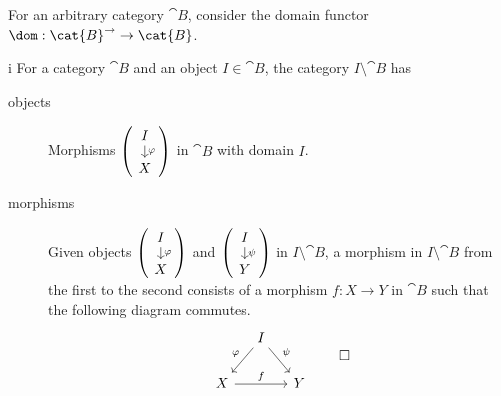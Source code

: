 \begin{exercise}
For an arbitrary category \(\cat{B}\), consider the domain functor \(\dom : \cat{B}^{\rightarrow} \to \cat{B}\).
\end{exercise}

\begin{partsolution}{i}
For a category \(\cat{B}\) and an object \(I \in \cat{B}\), the category \(I \setminus \cat{B}\) has
\begin{description}
\item[objects]
Morphisms \(\begin{pmatrix}\begin{tikzcd}[row sep=small] I \arrow[d, "\varphi"] \\ X\end{tikzcd}\end{pmatrix}\) in \(\cat{B}\) with domain \(I\).
\item[morphisms]
Given objects \(\begin{pmatrix}\begin{tikzcd}[row sep=small] I \arrow[d, "\varphi"] \\ X\end{tikzcd}\end{pmatrix}\) and \(\begin{pmatrix}\begin{tikzcd}[row sep=small] I \arrow[d, "\psi"] \\ Y\end{tikzcd}\end{pmatrix}\) in \(I \setminus \cat{B}\), a morphism in \(I \setminus \cat{B}\) from the first to the second consists of a morphism \(f : X \to Y\) in \(\cat{B}\) such that the following diagram commutes.
\begin{equation*}
\begin{tikzcd}[column sep=small]
& I \arrow[dl, "\varphi"{above left}] \arrow[dr, "\psi"] \\
X \arrow[rr, "f"] && Y
\end{tikzcd}
\qedhere
\end{equation*}
\end{description}
\end{partsolution}

